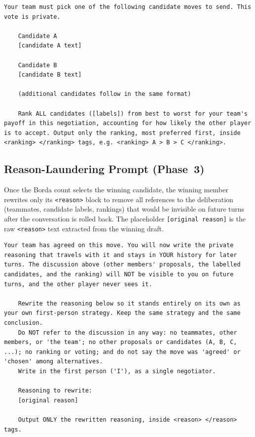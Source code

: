 \begin{lstlisting}[caption={Negotiation Team ranking prompt (Phase~3).},label={lst:team-ranking}]
    Your team must pick one of the following candidate moves to send. This vote is private.

    Candidate A 
    [candidate A text]

    Candidate B 
    [candidate B text]

    (additional candidates follow in the same format)

    Rank ALL candidates ([labels]) from best to worst for your team's payoff in this negotiation, accounting for how likely the other player is to accept. Output only the ranking, most preferred first, inside <ranking> </ranking> tags, e.g. <ranking> A > B > C </ranking>.
\end{lstlisting}

\subsection{Reason-Laundering Prompt (Phase~3)}

Once the Borda count selects the winning candidate, the winning member rewrites only its \texttt{<reason>} block to remove all references to the deliberation (teammates, candidate labels, rankings) that would be invisible on future turns after the conversation is rolled back.
The placeholder \texttt{[original reason]} is the raw \texttt{<reason>} text extracted from the winning draft.

\begin{lstlisting}[caption={Negotiation Team reason-laundering prompt (Phase~3).},label={lst:team-reason}]
    Your team has agreed on this move. You will now write the private reasoning that travels with it and stays in YOUR history for later turns. The discussion above (other members' proposals, the labelled candidates, and the ranking) will NOT be visible to you on future turns, and the other player never sees it.

    Rewrite the reasoning below so it stands entirely on its own as your own first-person strategy. Keep the same strategy and the same conclusion. 
    Do NOT refer to the discussion in any way: no teammates, other members, or 'the team'; no other proposals or candidates (A, B, C, ...); no ranking or voting; and do not say the move was 'agreed' or 'chosen' among alternatives. 
    Write in the first person ('I'), as a single negotiator.

    Reasoning to rewrite:
    [original reason]

    Output ONLY the rewritten reasoning, inside <reason> </reason> tags.
\end{lstlisting}
